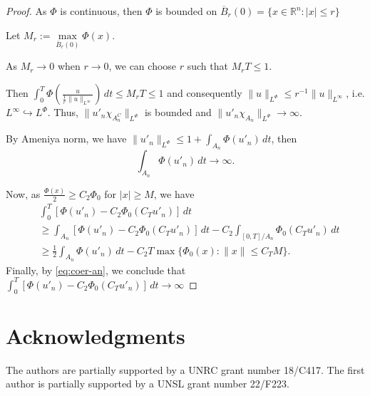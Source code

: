 \documentclass[twoside]{article}
\theoremstyle{remark}
\newcommand{\orlnor}{\|_{L^{\Phi}}}
\newcommand{\linf}{\|_{L^{\infty}}}
\newcommand{\rr}{\mathbb{R}}
\renewcommand{\leq}{\leqslant}
\renewcommand{\geq}{\geqslant}
\begin{document}
\begin{proof}
As $\Phi$ is continuous, then $\Phi$ is bounded on
$\overline{B}_r(0)=\{x\in \rr^n:|x|\leq r\}$

Let $M_r:=\max\limits_{\overline{B}_r(0)} \Phi(x)$.

As $M_r\to 0$ when $r\to 0$, we can choose $r$ such that $M_rT\leq 1$.

Then
$\int_0^T \Phi(\frac{u}{\frac{1}{r}\|u\linf})\,dt\leq M_rT\leq 1$
and consequently
$\|u\orlnor \leq r^{-1}\|u\linf$, i.e. $L^{\infty} \hookrightarrow L^\Phi$.
Thus,
$\|u'_n \chi_{A_n^C}\orlnor$ is bounded and $\|u'_n\chi_{A_n}\orlnor\to \infty$.

By Ameniya norm, we have
$\|u'_n\orlnor \leq 1+\int_{A_n} \Phi(u'_n)\,dt$, then
\begin{equation}\label{eq:coer-an}
\int_{A_n} \Phi(u'_n)\,dt\to \infty.
\end{equation}

Now, as $\frac{\Phi(x)}{2}\geq C_2\Phi_0$ for $|x|\geq M$, we have
\begin{equation}
\begin{split}
&\int_0^T [\Phi(u'_n)-C_2 \Phi_0(C_T u'_n)]\,dt
\\
&\geq
\int_{A_n} [\Phi(u'_n)-C_2 \Phi_0(C_T u'_n)]\,dt-C_2\int_{[0,T]/A_n} \Phi_0(C_Tu'_n)\,dt
\\
&\geq \frac{1}{2}\int_{A_n}\Phi(u'_n)\,dt-C_2T\max\{\Phi_0(x):\|x\|\leq C_TM\}.
\end{split}
\end{equation}
Finally, by \eqref{eq:coer-an}, we conclude that
$\int_0^T [\Phi(u'_n)-C_2 \Phi_0(C_T u'_n)]\,dt\to \infty$

\end{proof}


\section*{Acknowledgments}
The authors are partially supported by a UNRC grant number 18/C417. The first author is  partially supported by a  UNSL grant number 22/F223. 




% 
 
 

\end{document}
